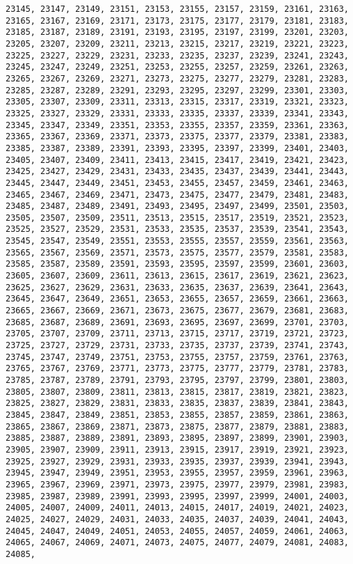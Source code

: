 \documentclass[11pt]{article}
\begin{document}
\begin{Verbatim}[commandchars=\\\{\}]
23145, 23147, 23149, 23151, 23153, 23155, 23157, 23159, 23161, 23163, 23165, 23167, 23169, 23171, 23173, 23175, 23177, 23179, 23181, 23183, 23185, 23187, 23189, 23191, 23193, 23195, 23197, 23199, 23201, 23203, 23205, 23207, 23209, 23211, 23213, 23215, 23217, 23219, 23221, 23223, 23225, 23227, 23229, 23231, 23233, 23235, 23237, 23239, 23241, 23243, 23245, 23247, 23249, 23251, 23253, 23255, 23257, 23259, 23261, 23263, 23265, 23267, 23269, 23271, 23273, 23275, 23277, 23279, 23281, 23283, 23285, 23287, 23289, 23291, 23293, 23295, 23297, 23299, 23301, 23303, 23305, 23307, 23309, 23311, 23313, 23315, 23317, 23319, 23321, 23323, 23325, 23327, 23329, 23331, 23333, 23335, 23337, 23339, 23341, 23343, 23345, 23347, 23349, 23351, 23353, 23355, 23357, 23359, 23361, 23363, 23365, 23367, 23369, 23371, 23373, 23375, 23377, 23379, 23381, 23383, 23385, 23387, 23389, 23391, 23393, 23395, 23397, 23399, 23401, 23403, 23405, 23407, 23409, 23411, 23413, 23415, 23417, 23419, 23421, 23423, 23425, 23427, 23429, 23431, 23433, 23435, 23437, 23439, 23441, 23443, 23445, 23447, 23449, 23451, 23453, 23455, 23457, 23459, 23461, 23463, 23465, 23467, 23469, 23471, 23473, 23475, 23477, 23479, 23481, 23483, 23485, 23487, 23489, 23491, 23493, 23495, 23497, 23499, 23501, 23503, 23505, 23507, 23509, 23511, 23513, 23515, 23517, 23519, 23521, 23523, 23525, 23527, 23529, 23531, 23533, 23535, 23537, 23539, 23541, 23543, 23545, 23547, 23549, 23551, 23553, 23555, 23557, 23559, 23561, 23563, 23565, 23567, 23569, 23571, 23573, 23575, 23577, 23579, 23581, 23583, 23585, 23587, 23589, 23591, 23593, 23595, 23597, 23599, 23601, 23603, 23605, 23607, 23609, 23611, 23613, 23615, 23617, 23619, 23621, 23623, 23625, 23627, 23629, 23631, 23633, 23635, 23637, 23639, 23641, 23643, 23645, 23647, 23649, 23651, 23653, 23655, 23657, 23659, 23661, 23663, 23665, 23667, 23669, 23671, 23673, 23675, 23677, 23679, 23681, 23683, 23685, 23687, 23689, 23691, 23693, 23695, 23697, 23699, 23701, 23703, 23705, 23707, 23709, 23711, 23713, 23715, 23717, 23719, 23721, 23723, 23725, 23727, 23729, 23731, 23733, 23735, 23737, 23739, 23741, 23743, 23745, 23747, 23749, 23751, 23753, 23755, 23757, 23759, 23761, 23763, 23765, 23767, 23769, 23771, 23773, 23775, 23777, 23779, 23781, 23783, 23785, 23787, 23789, 23791, 23793, 23795, 23797, 23799, 23801, 23803, 23805, 23807, 23809, 23811, 23813, 23815, 23817, 23819, 23821, 23823, 23825, 23827, 23829, 23831, 23833, 23835, 23837, 23839, 23841, 23843, 23845, 23847, 23849, 23851, 23853, 23855, 23857, 23859, 23861, 23863, 23865, 23867, 23869, 23871, 23873, 23875, 23877, 23879, 23881, 23883, 23885, 23887, 23889, 23891, 23893, 23895, 23897, 23899, 23901, 23903, 23905, 23907, 23909, 23911, 23913, 23915, 23917, 23919, 23921, 23923, 23925, 23927, 23929, 23931, 23933, 23935, 23937, 23939, 23941, 23943, 23945, 23947, 23949, 23951, 23953, 23955, 23957, 23959, 23961, 23963, 23965, 23967, 23969, 23971, 23973, 23975, 23977, 23979, 23981, 23983, 23985, 23987, 23989, 23991, 23993, 23995, 23997, 23999, 24001, 24003, 24005, 24007, 24009, 24011, 24013, 24015, 24017, 24019, 24021, 24023, 24025, 24027, 24029, 24031, 24033, 24035, 24037, 24039, 24041, 24043, 24045, 24047, 24049, 24051, 24053, 24055, 24057, 24059, 24061, 24063, 24065, 24067, 24069, 24071, 24073, 24075, 24077, 24079, 24081, 24083, 24085, 
\end{Verbatim}
\end{document}
